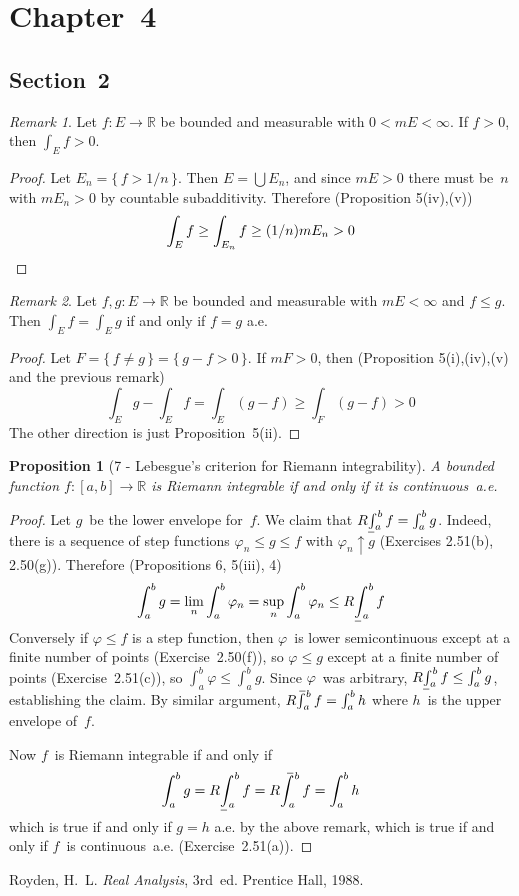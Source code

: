\documentclass[letterpaper,12pt]{article}
\newcommand{\R}{\mathbb{R}}
\newcommand{\upto}{\uparrow}
\newcommand{\bigunion}{\bigcup}
\newcommand{\m}{m}
\newcommand{\doupperint}[2]{\smash{\int\limits^{\underline{\phantom{x}}}}\mathop{\vphantom{\int}}\nolimits_{\!\!\!\!{#1}}^{\!{#2}}}
\newcommand{\dolowerint}[2]{\smash{\int\limits_{\overline{\phantom{x}}}}\mathop{\vphantom{\int}}\nolimits_{\!\!\!\!{#1}}^{\!{#2}}}
\newcommand{\upperint}[2]{\mathchoice{\doupperint{#1}{#2}}{\doupperint{\;#1}{#2}}{}{}}
\newcommand{\lowerint}[2]{\mathchoice{\dolowerint{#1}{#2}}{\dolowerint{\;#1}{#2}}{}{}}
\newcommand{\Rupperint}[2]{R\upperint{#1}{#2}}
\newcommand{\Rlowerint}[2]{R\lowerint{#1}{#2}}
\theoremstyle{plain}
\newtheorem*{prop}{Proposition}
\theoremstyle{definition}
\theoremstyle{remark}
\newtheorem*{rmk}{Remark}
\begin{document}
\section*{Chapter~4}
\subsection*{Section~2}
\begin{rmk}
Let \(f:E\to\R\) be bounded and measurable with \(0<\m E<\infty\). If \(f>0\), then \(\int_E f>0\).
\end{rmk}
\begin{proof}
Let \(E_n=\{\,f>1/n\,\}\). Then \(E=\bigunion E_n\), and since \(\m E>0\) there must be~\(n\) with \(\m E_n>0\) by countable subadditivity. Therefore (Proposition 5(iv),(v))
\[\int_E f\ge\int_{E_n}f\ge(1/n)\m E_n>0\qedhere\]
\end{proof}

\begin{rmk}
Let \(f,g:E\to\R\) be bounded and measurable with \(\m E<\infty\) and \(f\le g\). Then \(\int_E f=\int_E g\) if and only if \(f=g\) a.e.
\end{rmk}
\begin{proof}
Let \(F=\{\,f\ne g\,\}=\{\,g-f>0\,\}\). If \(\m F>0\), then (Proposition 5(i),(iv),(v) and the previous remark)
\[\int_E g-\int_E f=\int_E(g-f)\ge\int_F(g-f)>0\]
The other direction is just Proposition~5(ii).
\end{proof}

\begin{prop}[7 - Lebesgue's criterion for Riemann integrability]
A bounded function \(f:[a,b]\to\R\) is Riemann integrable if and only if it is continuous~a.e.
\end{prop}
\begin{proof}
Let \(g\)~be the lower envelope for~\(f\). We claim that \(\Rlowerint{a}{b}f=\int_a^b g\). Indeed, there is a sequence of step functions \(\varphi_n\le g\le f\) with \(\varphi_n\upto g\) (Exercises 2.51(b), 2.50(g)). Therefore (Propositions 6, 5(iii), 4)
\[\int_a^b g=\lim_n\int_a^b\varphi_n=\sup_n\int_a^b\varphi_n\le\Rlowerint{a}{b}f\]
Conversely if \(\varphi\le f\) is a step function, then \(\varphi\)~is lower semicontinuous except at a finite number of points (Exercise~2.50(f)), so \(\varphi\le g\) except at a finite number of points (Exercise~2.51(c)), so \(\int_a^b\varphi\le\int_a^b g\). Since \(\varphi\)~was arbitrary, \(\Rlowerint{a}{b}f\le\int_a^b g\), establishing the claim. By similar argument, \(\Rupperint{a}{b}f=\int_a^b h\) where \(h\)~is the upper envelope of~\(f\).

Now \(f\)~is Riemann integrable if and only if
\[\int_a^b g=\Rlowerint{a}{b}f=\Rupperint{a}{b}f=\int_a^b h\]
which is true if and only if \(g=h\) a.e. by the above remark, which is true if and only if \(f\)~is continuous~a.e. (Exercise~2.51(a)).
\end{proof}

\begin{thebibliography}{0}
 Royden, H.~L. \textit{Real Analysis}, 3rd~ed. Prentice Hall, 1988.
\end{thebibliography}
\end{document}
